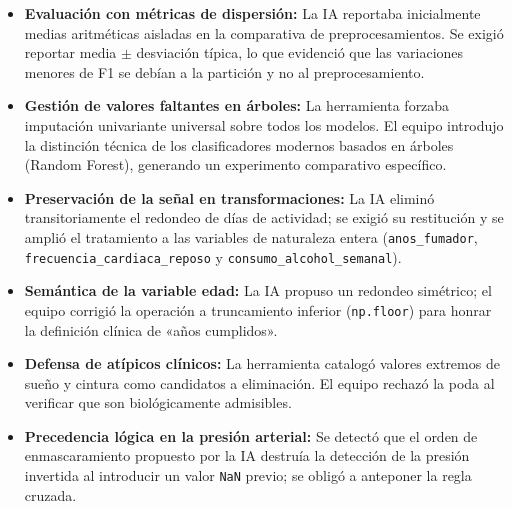 \documentclass[12pt,a4paper,oneside]{book}
\begin{document}
\begin{itemize}
    \item \textbf{Evaluación con métricas de dispersión:} La IA reportaba inicialmente medias aritméticas aisladas en la comparativa de preprocesamientos. Se exigió reportar media $\pm$ desviación típica, lo que evidenció que las variaciones menores de F1 se debían a la partición y no al preprocesamiento.
    \item \textbf{Gestión de valores faltantes en árboles:} La herramienta forzaba imputación univariante universal sobre todos los modelos. El equipo introdujo la distinción técnica de los clasificadores modernos basados en árboles (Random Forest), generando un experimento comparativo específico.
    \item \textbf{Preservación de la señal en transformaciones:} La IA eliminó transitoriamente el redondeo de días de actividad; se exigió su restitución y se amplió el tratamiento a las variables de naturaleza entera (\texttt{anos\_fumador}, \texttt{frecuencia\_cardiaca\_reposo} y \texttt{consumo\_alcohol\_semanal}).
    \item \textbf{Semántica de la variable edad:} La IA propuso un redondeo simétrico; el equipo corrigió la operación a truncamiento inferior (\texttt{np.floor}) para honrar la definición clínica de «años cumplidos».
    \item \textbf{Defensa de atípicos clínicos:} La herramienta catalogó valores extremos de sueño y cintura como candidatos a eliminación. El equipo rechazó la poda al verificar que son biológicamente admisibles.
    \item \textbf{Precedencia lógica en la presión arterial:} Se detectó que el orden de enmascaramiento propuesto por la IA destruía la detección de la presión invertida al introducir un valor \texttt{NaN} previo; se obligó a anteponer la regla cruzada.
\end{itemize}
\end{document}
